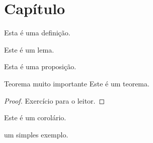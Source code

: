 \chapter{Capítulo}

\begin{df}[]{}{}
Esta é uma definição.
\end{df}

\begin{lema}[]{}{}
Este é um lema.
\end{lema}

\begin{prop}[]{}{}
Esta é uma proposição.
\end{prop}

\begin{teo}[]{Teorema muito importante}{}
Este é um teorema.
\end{teo}

\begin{proof}
Exercício para o leitor.
\end{proof}

\begin{coro}[]{}{}
Este é um corolário.
\end{coro}

\begin{ex}
um simples exemplo.
\end{ex}